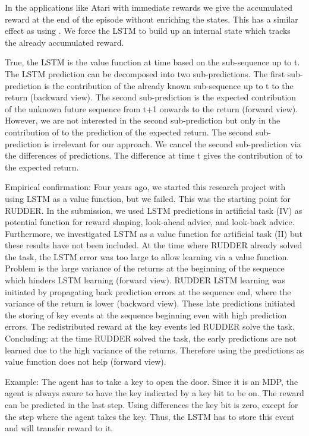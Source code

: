 \documentclass{article}
\begin{document}
\begin{appendices}
In the applications like Atari with immediate rewards 
we give the accumulated reward at the end of the episode without enriching the states. 
This has a similar effect as using . 
We force the LSTM to build up an internal state 
which tracks the already accumulated reward. 

True, the LSTM is the value function at time  based on the 
 sub-sequence up to t. 
The LSTM prediction can be decomposed into two sub-predictions. 
The first sub-prediction is the contribution of the already known 
 sub-sequence up to t to the return (backward view). 
The second sub-prediction is the expected contribution 
of the unknown future sequence from t+1 onwards 
to the return (forward view). 
However, we are not interested in the second sub-prediction 
but only in the contribution of  to the prediction of the expected return. 
The second sub-prediction is irrelevant for our approach. 
We cancel the second sub-prediction via the differences of predictions. 
The difference at time t gives the contribution of  to the expected return.

Empirical confirmation:
Four years ago, 
we started this research project with using LSTM as a value function, but we failed. 
This was the starting point for RUDDER. 
In the submission, we used LSTM predictions in artificial task (IV) 
as potential function for reward shaping, look-ahead advice, and look-back advice. 
Furthermore, we investigated LSTM as a value function for artificial task (II) 
but these results have not been included.
At the time where RUDDER already solved the task, 
the LSTM error was too large to allow learning via a value function. 
Problem is the large variance of the returns at the beginning of the sequence 
which hinders LSTM learning (forward view). 
RUDDER LSTM learning was initiated by propagating back prediction errors at the sequence end, 
where the variance of the return is lower (backward view). 
These late predictions initiated the storing of key events at the sequence beginning 
even with high prediction errors. 
The redistributed reward at the key events led RUDDER solve the task. 
Concluding: at the time RUDDER solved the task, 
the early predictions are not learned due to the high variance of the returns. 
Therefore using the predictions as value function does not help (forward view).

Example: The agent has to take a key to open the door. 
Since it is an MDP, 
the agent is always aware to have the key indicated by a key bit to be on. 
The reward can be predicted in the last step. 
Using differences  the key bit is zero, 
except for the step where the agent takes the key. 
Thus, the LSTM has to store this event and will transfer reward to it.


\end{appendices}
\end{document}
